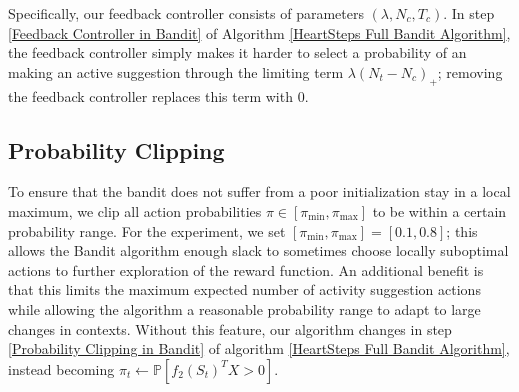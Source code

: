 Specifically, our feedback controller consists of parameters $(\lambda, N_c, T_c)$.  In step \ref{Feedback Controller in Bandit} of Algorithm \ref{HeartSteps Full Bandit Algorithm}, the feedback controller simply makes it harder to select a probability of an making an active suggestion through the limiting term $\lambda (N_t - N_c)_+$; removing the feedback controller replaces this term with $0$.

\subsection{Probability Clipping}

To ensure that the bandit does not suffer from a poor initialization stay in a local maximum, we clip all action probabilities $\pi \in [\pi_{\text{min}}, \pi_\text{max}]$ to be within a certain probability range.  For the experiment, we set $[\pi_\text{min},\pi_\text{max}] = [0.1,0.8]$; this allows the Bandit algorithm enough slack to sometimes choose locally suboptimal actions to further exploration of the reward function.  An additional benefit is that this limits the maximum expected number of activity suggestion actions while allowing the algorithm a reasonable probability range to adapt to large changes in contexts.  Without this feature, our algorithm changes in step \ref{Probability Clipping in Bandit} of algorithm \ref{HeartSteps Full Bandit Algorithm}, instead becoming $\pi_t \leftarrow \mathbb{P}\left[f_2(S_t)^T X > 0 \right]$.

\clearpage



